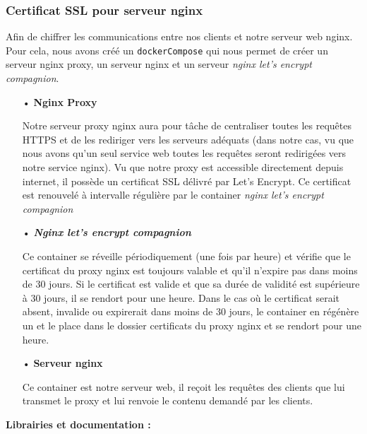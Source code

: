 \subsubsection{Certificat SSL pour serveur nginx}

Afin de chiffrer les communications entre nos clients et notre serveur web nginx.
Pour cela, nous avons créé un \texttt{dockerCompose} qui nous permet de créer un serveur nginx proxy, un serveur nginx et un serveur \emph{nginx let's encrypt compagnion}.
\medskip

\begin{itemize}

\item[•] \textbf{Nginx Proxy}
\vspace{1mm}

Notre serveur proxy nginx aura pour tâche de centraliser toutes les requêtes HTTPS et de les rediriger vers les serveurs adéquats (dans notre cas, vu que nous avons qu'un seul service web toutes les requêtes seront redirigées vers notre service nginx).
Vu que notre proxy est accessible directement depuis internet, il possède un certificat SSL délivré par Let's Encrypt.
Ce certificat est renouvelé à intervalle régulière par le container \emph{nginx let's encrypt compagnion}
\vspace{3mm}

\item[•] \textbf{\emph{Nginx let's encrypt compagnion}}
\vspace{1mm}

Ce container se réveille périodiquement (une fois par heure) et vérifie que le certificat du proxy nginx est toujours valable et qu'il n'expire pas dans moins de 30 jours.
Si le certificat est valide et que sa durée de validité est supérieure à 30 jours, il se rendort pour une heure.
Dans le cas où le certificat serait absent, invalide ou expirerait dans moins de 30 jours, le container en régénère un et le place dans le dossier certificats du proxy nginx et se rendort pour une heure.
\vspace{3mm}

\item[•] \textbf{Serveur nginx}
\vspace{1mm}

Ce container est notre serveur web, il reçoit les requêtes des clients que lui transmet le proxy et lui renvoie le contenu demandé par les clients.
\end{itemize}

\medskip
\textbf{Librairies et documentation :}

